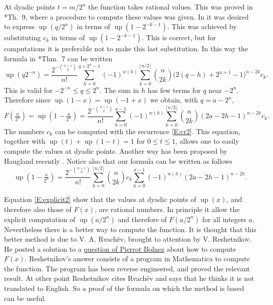 \documentclass[10pt]{amsart}
\theoremstyle{definition}
\theoremstyle{remark}
\DeclareMathOperator\up{up}
\begin{document}
At dyadic points $t=m/2^n$  the function takes rational values. This was proved 
in \cite{MR666839}*{Th.~9}, where a procedure to compute these values was given.
In \cite{MR666839} it was desired to express $\up(q/2^n)$ in terms of $\up(1-2^{-k-1})$. 
This was achieved by substituting $c_k$ in terms of $\up(1-2^{-k-1})$. This is 
correct, but for computations it is preferable not to make this last substitution. 
In this way the formula in \cite{MR666839}*{Thm.~7} can be written
\[\up(q2^{-n})=\frac{2^{-\binom{n+1}{2}}}{n!}\sum_{h=0}^{q+2^n-1}(-1)^{w(h)}
\sum_{k=0}^{\lfloor n/2\rfloor}\binom{n}{2k}\bigl(2(q-h)+2^{n+1}-1\bigr)^{n-2k}c_k.\]
This is valid for $-2^{-n}\le q\le 2^n$. 
The sum in $h$ has few terms for $q$ near $-2^{n}$.
Therefore since $\up(1-x)=\up(-1+x)$ we obtain, with $q=a-2^{n}$,
\begin{equation}\label{E:explicit}
F(\tfrac{a}{2^n})=\up(1-\tfrac{a}{2^n})=
\frac{2^{-\binom{n+1}{2}}}{n!}\sum_{h=0}^{a-1}(-1)^{w(h)}
\sum_{k=0}^{\lfloor n/2\rfloor}\binom{n}{2k}(2a-2h-1)^{n-2k}c_k.
\end{equation}
The numbers $c_k$ can be computed with the recurrence \eqref{E:cr2}. 
This  equation, together with $\up(t)+\up(1-t)=1$ for $0\le t\le1$,  allows one to easily 
compute the values at dyadic points. 
Another way has been proposed by Haugland recently \cite{H}.
Notice also that our formula can be written as follows
\begin{equation}\label{E:explicit2}
\up(1-\tfrac{a}{2^n})=
\frac{2^{-\binom{n+1}{2}}}{n!}
\sum_{k=0}^{\lfloor n/2\rfloor}\binom{n}{2k}c_k
\sum_{h=0}^{a-1}(-1)^{w(h)}
(2a-2h-1)^{n-2k}.
\end{equation}

Equation \eqref{E:explicit2} show that the values at dyadic points of $\up(x)$, and therefore also those  
of $F(x)$, are rational numbers. In principle it allow the explicit computation of $\up(a/2^n)$ 
and therefore of $F(a/2^n)$ for all integers $a$. Nevertheless there is a better way to compute the function.
It is thought that  this better method is due to V. A. Rvach{\"e}v,  
brought to attention by V. Reshetnikov. He posted a solution to a 
\href{http://mathematica.stackexchange.com/questions/120331/how-do-i-numerically-evaluate-and-plot-the-fabius-function}{question of Pierrot Bolnez} about how to compute $F(x)$. 
Reshetnikov's answer consists of a program 
in Mathematica to compute the function. The program has been reverse engineered, 
and proved the 
relevant result.  At other point Reshetnikov cites Rvach{\"e}v and  says that he thinks it is not 
translated to English.  So a proof of the formula on which the method is based can be useful.
\end{document}
